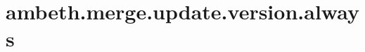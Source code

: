 \section{ambeth.merge.update.version.always}
\label{configuration:AmbethMergeUpdateVersionAlways}
\AvailableInJavaOnly{\TODO}